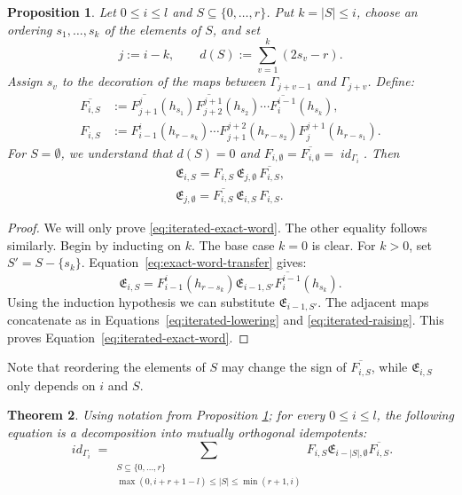 \documentclass[12pt]{amsart}
\newtheorem{theorem}{Theorem}[section]
\newtheorem{proposition}[theorem]{Proposition}
\theoremstyle{definition}
\theoremstyle{remark}
\numberwithin{equation}{section}
\numberwithin{figure}{section}
\DeclareMathOperator{\idfoam}{\mathit{id}}
\begin{document}
\begin{proposition}\label{prop:iterated-transfer}
Let $0\leq i\leq l$ and $S\subseteq\{0,\ldots,r\}$. Put
$k=|S|\leq i$, choose an ordering $s_1,\ldots,s_k$ of the elements of
$S$, and set
\[
 j:=i-k,
 \qquad
 d(S):=\sum_{v=1}^{k}(2s_v-r).
\]
Assign $s_v$ to the decoration of the maps between $\Gamma_{j+v-1}$ and $\Gamma_{j+v}$. Define:
\begin{align}
 \overline{F_{i,S}}
 &:={\overline{F_{j+1}^{j}}}(h_{s_1})
    {\overline{F_{j+2}^{j+1}}}(h_{s_2})\cdots
    {\overline{F_i^{i-1}}}(h_{s_k}),
 \label{eq:iterated-lowering}\\
 F_{i,S}
 &:=F_{i-1}^{i}(h_{r-s_k})\cdots
    F_{j+1}^{j+2}(h_{r-s_2})
    F_j^{j+1}(h_{r-s_1}).
 \label{eq:iterated-raising}
\end{align}
For $S=\emptyset$, we understand that $d(S)=0$ and $F_{i,\emptyset}=\overline{F_{i,\emptyset}}= \idfoam_{\Gamma_i}$. Then
\begin{align}
 \mathfrak{E}_{i,S}=F_{i,S}\,\mathfrak{E}_{j,\emptyset}\,\overline{F_{i,S}}, \label{eq:iterated-exact-word}\\
  \mathfrak{E}_{j,\emptyset}=\overline{F_{i,S}}\,\mathfrak{E}_{i,S}\,F_{i,S}. \label{eq:iterated-exact-word-lower-transfer}
\end{align}
\end{proposition}

\begin{proof}
We will only prove \eqref{eq:iterated-exact-word}. The other equality follows similarly. Begin by inducting on $k$. The base case $k=0$ is clear. For $k > 0$, set $S'=S-\{s_k\}$. Equation~\eqref{eq:exact-word-transfer} gives:
\[
 \mathfrak{E}_{i,S}=F_{i-1}^{i}(h_{r-s_k})\mathfrak{E}_{i-1,S'} \overline{F_i^{i-1}}(h_{s_k}).
\]
Using the induction hypothesis we can substitute $\mathfrak{E}_{i-1,S'}$. The adjacent maps concatenate as in Equations~\eqref{eq:iterated-lowering} and \eqref{eq:iterated-raising}. This proves Equation~\eqref{eq:iterated-exact-word}.
\end{proof}

Note that reordering the elements of $S$ may change the sign of $\overline{F_{i,S}}$, while $\mathfrak{E}_{i,S}$ only depends on $i$ and $S$. 

\begin{theorem}\label{thm:upper-factor-through}
Using notation from Proposition \ref{prop:iterated-transfer}; for every $0\leq i\leq l$, the following equation is a decomposition into mutually orthogonal idempotents:
\begin{equation}\label{eq:upper-factor-through}
 \idfoam_{\Gamma_i}=
 \sum_{\substack{S\subseteq\{0,\ldots,r\}\\
         \max(0,i+r+1-l)\leq |S|\leq\min(r+1,i)}}
 F_{i,S}\mathfrak{E}_{i-|S|,\emptyset}\overline{F_{i,S}}.
\end{equation}
\end{theorem}
\end{document}
